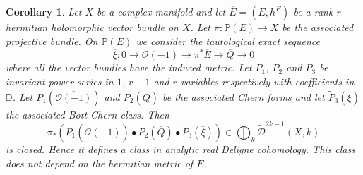 \documentclass[10pt,twoside]{article}
\numberwithin{equation}{section}
\theoremstyle{plain}
\newtheorem{corollary}[equation]{Corollary}
\theoremstyle{definition}
\begin{document}
\begin{corollary}\label{cor:3}
  Let $X$ be a complex manifold and let $\overline E=(E,h^{E})$ be a
  rank $r$ hermitian holomorphic 
  vector bundle on $X$. Let $\pi\colon \mathbb{P}(E)\longrightarrow X$ be
  the associated projective bundle. On $\mathbb{P}(E)$ we consider the
  tautological exact sequence
  \begin{displaymath}
    \overline \xi\colon
    0\longrightarrow \overline {\mathcal{O}(-1)}\longrightarrow \pi
    ^{\ast}\overline E
    \longrightarrow \overline Q \longrightarrow 0
  \end{displaymath}
  where all the vector bundles have the induced metric. Let $P_{1}$,
  $P_{2}$ and $P_{3}$ be invariant power series in $1$, $r-1$ and $r$
  variables respectively with coefficients in $\mathbb{D}$. Let
  $P_{1}(\overline {\mathcal{O}(-1)})$ and 
  $P_{2}(\overline Q)$ be the associated Chern forms and let
  $\widetilde {P}_{3}(\overline {\xi})$ the associated Bott-Chern
  class. Then 
  $$ \pi_{\ast}(P_{1}(\overline {\mathcal{O}(-1)})\bullet
  P_{2}(\overline Q)\bullet
  \widetilde {P}_{3}(\overline {\xi}))\in
  \bigoplus_{k}\widetilde{\mathcal{D}}^{2k-1}(X,k) 
  $$ 
  is closed. Hence it defines a class in analytic real Deligne
  cohomology. This class does not depend on the hermitian metric of
  $E$.   
\end{corollary}
\end{document}
